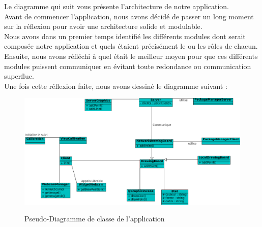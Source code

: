 \documentclass{report}
\begin{document}
				\newpage			
				Le diagramme qui suit vous présente l'architecture de notre application. \\
Avant de commencer l'application, nous avons décidé de passer un long moment sur la réflexion pour avoir une architecture solide et modulable.\\Nous avons dans un premier temps identifié les différents modules dont serait composée notre application et quels étaient précisément le ou les rôles de chacun. \\Ensuite, nous avons réfléchi à quel était le meilleur moyen pour que ces différents modules puissent communiquer en évitant toute redondance ou communication superflue. \\Une fois cette réflexion faite, nous avons dessiné le diagramme suivant : \\
				\begin{figure}[!h]
						\centering
						\includegraphics[scale=0.6]{../uml/classes.png}\\
						\caption{Pseudo-Diagramme de classe de l'application}
						\label{Pseudo-Diagramme de classe de l'application}
				\end{figure}
				
\end{document}
